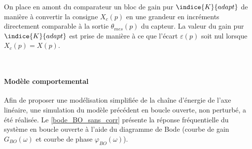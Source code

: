 \ifprof
\else
\vspace*{1em}
On place en amont du comparateur un bloc de gain pur $\indice{K}{adapt}$ de manière à convertir la consigne $X_c(p)$ en une grandeur en incréments directement comparable à la sortie $\theta_{mes}(p)$ du capteur. La valeur du gain pur $\indice{K}{adapt}$ est prise de manière à ce que l'écart $\varepsilon(p)$ soit nul lorsque $X_c(p) =  X(p)$.


\fi


\ifprof

\\
\fi

\ifprof
\else
\paragraph{Modèle comportemental}

Afin de proposer une modélisation simplifiée de la chaîne d'énergie de l'axe linéaire, une simulation du modèle précédent en boucle ouverte, non perturbé, a été réalisée. Le \ref{bode_BO_sans_corr}  présente la réponse fréquentielle du système en boucle ouverte à l'aide du diagramme de Bode (courbe de gain $G_{BO}(\omega)$ et courbe de phase $\varphi_{BO}(\omega)$). 

